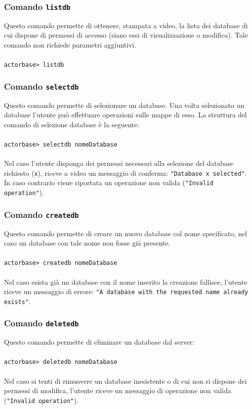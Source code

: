\documentclass[a4paper]{article}
\begin{document}
	\subsubsection{Comando \texttt{listdb}}
	Questo comando permette di ottenere, stampata a video, la lista dei database di cui dispone di permessi di accesso (siano essi di visualizzazione o modifica). Tale comando non richiede parametri aggiuntivi.
	\\ \\
	\texttt{actorbase>	listdb}

	\subsubsection{Comando \texttt{selectdb}}
	Questo comando permette di selezionare un database. Una volta selezionato un database l'utente può effettuare operazioni sulle mappe di esso. La struttura del comando di selezione database è la seguente:
	\\ \\
	\texttt{actorbase>	selectdb nomeDatabase}
	\\ \\
	Nel caso l'utente disponga dei permessi necessari alla selezione del database richiesto (\texttt{x}), riceve a video un messaggio di conferma: \texttt{"Database x selected"}. In caso contrario viene riportata un operazione non valida (\texttt{"Invalid operation"}).

	\subsubsection{Comando \texttt{createdb}}
	Questo comando permette di creare un nuovo database col nome specificato, nel caso  un database con tale nome non fosse già presente.
	\\ \\
	\texttt{actorbase>	createdb nomeDatabase}
	\\ \\
	Nel caso esista già un database con il nome inserito la creazione fallisce, l'utente riceve un messaggio di errore: \texttt{"A database with the requested name already exists"}.

	\subsubsection{Comando \texttt{deletedb}}
	Questo comando permette di eliminare un database dal server:
	\\ \\
	\texttt{actorbase>	deletedb nomeDatabase}
	\\ \\
	Nel caso si tenti di rimuovere un database inesistente o di cui non si dispone dei permessi di modifica, l'utente riceve un messaggio di operazione non valida (\texttt{"Invalid operation"}).
	
\end{document}

